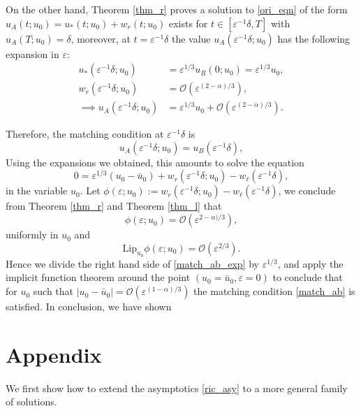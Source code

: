\documentclass[letterpaper,11pt]{article}
\newcommand{\rmO}{\mathcal{O}}
\newcommand{\eps}{\varepsilon}
\numberwithin{equation}{section}
\theoremstyle{plain}
\begin{document}
On the other hand, Theorem \ref{thm_r} proves a solution to \eqref{ori_eqn} of the form $u_A(t;u_0) = u_*(t; u_0) + w_r(t; u_0)$ exists for $ t \in [\eps^{-1}\delta, T]$ with $u_A(T;u_0) = \delta$, moreover, at $t=\eps^{-1}\delta$ the value $u_A(\eps^{-1}\delta; u_0)$ has the following expansion in $\eps$:
\begin{align*}
u_*(\eps^{-1}\delta; u_0) &= \eps^{1/3}u_R(0;u_0) =  \eps^{1/3}u_0,\\
w_r(\eps^{-1}\delta ; u_0) &= \rmO(\eps^{(2-\alpha)/3}),\\
\implies  u_A(\eps^{-1}\delta; u_0 ) &= \eps^{1/3}u_0 + \rmO(\eps^{(2-\alpha)/3}).
\end{align*}

Therefore, the matching condition at $\eps^{-1}\delta$ is
\begin{equation}\label{match_ab}
u_A(\eps^{-1}\delta; u_0) = u_B(\eps^{-1}\delta),
\end{equation}
Using the expansions we obtained, this amounts to solve the equation
\begin{equation}\label{match_ab_exp}
0= \eps^{1/3}(u_0 - \bar{u}_0) + w_r(\eps^{-1}\delta; u_0)-w_\ell(\eps^{-1}\delta),
\end{equation}
in the variable $u_0$.
Let $\phi(\eps; u_0) :=  w_r(\eps^{-1}\delta; u_0)-w_\ell(\eps^{-1}\delta)$, we conclude from Theorem \ref{thm_r} and Theorem \ref{thm_l} that
\[
\phi(\eps; u_0) = \rmO(\eps^{2-\alpha)/3}), 
\]
uniformly in $u_0$ and 
\[
\text{Lip}_{u_0} \phi(\eps; u_0) = \rmO(\eps^{2/3}).
\]
Hence we divide the right hand side of \eqref{match_ab_exp} by $\eps^{1/3}$, and apply the implicit function theorem around the point $(u_0=\bar{u}_0, \eps=0)$ to conclude that for $u_0$ such that $|u_0- \bar{u}_0| = \rmO(\eps^{(1-\alpha)/3})$ the matching condition \eqref{match_ab} is satisfied. In conclusion, we have shown


\pagebreak
\section*{Appendix}
\renewcommand{\thesubsection}{\Alph{subsection}}
We first show how to extend the asymptotics \eqref{ric_asy} to a more general family of solutions.
\end{document}
